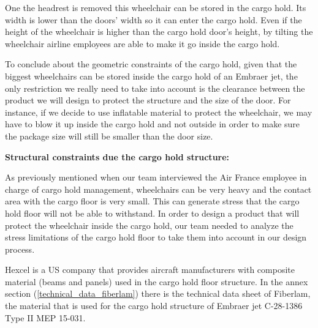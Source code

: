 One the headrest is removed this wheelchair can be stored in the cargo hold. Its width is lower than the doors’ width so it can enter the cargo hold. Even if the height of the wheelchair is higher than the cargo hold door’s height, by tilting the wheelchair airline employees are able to make it go inside the cargo hold.

To conclude about the geometric constraints of the cargo hold, given that the biggest wheelchairs can be stored inside the cargo hold of an Embraer jet, the only restriction we really need to take into account is the clearance between the product we will design to protect the structure and the size of the door. For instance, if we decide to use inflatable material to protect the wheelchair, we may have to blow it up inside the cargo hold and not outside in order to make sure the package size will still be smaller than the door size.

\textbf{Structural constraints due the cargo hold structure:}

As previously mentioned when our team interviewed the Air France employee in charge of cargo hold management, wheelchairs can be very heavy and the contact area with the cargo floor is very small. This can generate stress that the cargo hold floor will not be able to withstand. In order to design a product that will protect the wheelchair inside the cargo hold, our team needed to analyze the stress limitations of the cargo hold floor to take them into account in our design process.

Hexcel is a US company that provides aircraft manufacturers with composite material (beams and panels) used in the cargo hold floor structure. In the annex section (\ref{technical_data_fiberlam}) there is the technical data sheet of Fiberlam, the material that is used for the cargo hold structure of Embraer jet C-28-1386 Type II MEP 15-031.

